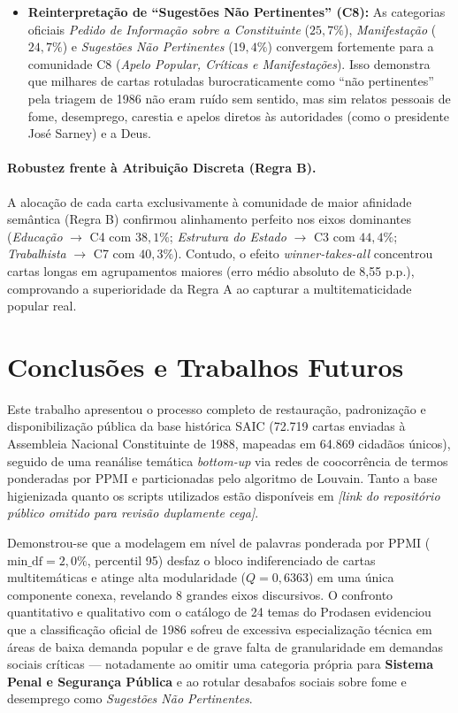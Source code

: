 \documentclass[12pt]{article}
\newcommand{\repolink}{\textit{[link do repositório público omitido para revisão duplamente cega]}}
\begin{document}
\begin{itemize}
    \item \textbf{Reinterpretação de ``Sugestões Não Pertinentes'' (C8):} As categorias oficiais \textit{Pedido de Informação sobre a Constituinte} ($25{,}7\%$), \textit{Manifestação} ($24{,}7\%$) e \textit{Sugestões Não Pertinentes} ($19{,}4\%$) convergem fortemente para a comunidade C8 (\textit{Apelo Popular, Críticas e Manifestações}). Isso demonstra que milhares de cartas rotuladas burocraticamente como ``não pertinentes'' pela triagem de 1986 não eram ruído sem sentido, mas sim relatos pessoais de fome, desemprego, carestia e apelos diretos às autoridades (como o presidente José Sarney) e a Deus.
\end{itemize}

\paragraph{Robustez frente à Atribuição Discreta (Regra B).}
A alocação de cada carta exclusivamente à comunidade de maior afinidade semântica (Regra B) confirmou alinhamento perfeito nos eixos dominantes (\textit{Educação} $\to$ C4 com $38{,}1\%$; \textit{Estrutura do Estado} $\to$ C3 com $44{,}4\%$; \textit{Trabalhista} $\to$ C7 com $40{,}3\%$). Contudo, o efeito \textit{winner-takes-all} concentrou cartas longas em agrupamentos maiores (erro médio absoluto de 8,55 p.p.), comprovando a superioridade da Regra A ao capturar a multitematicidade popular real.

\section{Conclusões e Trabalhos Futuros}

Este trabalho apresentou o processo completo de restauração, padronização e disponibilização pública da base histórica SAIC (72.719 cartas enviadas à Assembleia Nacional Constituinte de 1988, mapeadas em 64.869 cidadãos únicos), seguido de uma reanálise temática \textit{bottom-up} via redes de coocorrência de termos ponderadas por PPMI e particionadas pelo algoritmo de Louvain. Tanto a base higienizada quanto os scripts utilizados estão disponíveis em \repolink.

Demonstrou-se que a modelagem em nível de palavras ponderada por PPMI ($\text{min\_df} = 2{,}0\%$, percentil 95) desfaz o bloco indiferenciado de cartas multitemáticas e atinge alta modularidade ($Q = 0,6363$) em uma única componente conexa, revelando 8 grandes eixos discursivos. O confronto quantitativo e qualitativo com o catálogo de 24 temas do Prodasen evidenciou que a classificação oficial de 1986 sofreu de excessiva especialização técnica em áreas de baixa demanda popular e de grave falta de granularidade em demandas sociais críticas --- notadamente ao omitir uma categoria própria para \textbf{Sistema Penal e Segurança Pública} e ao rotular desabafos sociais sobre fome e desemprego como \textit{Sugestões Não Pertinentes}.
\end{document}
